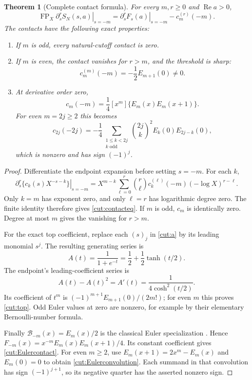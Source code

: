 \documentclass[11pt]{article}
\newtheorem{theorem}{Theorem}[section]
\theoremstyle{definition}
\theoremstyle{remark}
\numberwithin{equation}{section}
\newcommand{\FP}{\operatorname{FP}}
\newcommand{\Rea}{\operatorname{Re}}
\begin{document}
\begin{theorem}[Complete contact formula]\label{cut:contacts}
For every $m,r\ge0$ and $\Rea a>0$,
\begin{equation}\label{cut:contacteq}
 \boxed{\displaystyle
 \FP_X\left.\partial_s^rS_N(s,a)\right|_{s=-m}
   =\left.\partial_s^rF_s(a)\right|_{s=-m}-c_m^{(r)}(-m).}
\end{equation}
The contacts have the following exact properties:
\begin{enumerate}
\item If $m$ is odd, every natural-cutoff contact is zero.
\item If $m$ is even, the contact vanishes for $r>m$, and the threshold
is sharp:
\begin{equation}\label{cut:top}
 c_m^{(m)}(-m)=-\frac12 E_{m+1}(0)\ne0.
\end{equation}
\item At derivative order zero,
\begin{equation}\label{cut:Eulercontact}
 c_m(-m)=\frac14[x^m]\{E_m(x)E_m(x+1)\}.
\end{equation}
For even $m=2j\ge2$ this becomes
\begin{equation}\label{cut:Eulerconvolution}
 c_{2j}(-2j)
 =-\frac14\sum_{\substack{1\le k<2j\\k\text{ odd}}}
     \binom{2j}{k}^{\!2}E_k(0)E_{2j-k}(0),
\end{equation}
which is nonzero and has sign $(-1)^j$.
\end{enumerate}
\end{theorem}
\begin{proof}
Differentiate the endpoint expansion before setting $s=-m$.
For each $k$,
\[
 \left.\partial_s^r\{c_k(s)X^{-s-k}\}\right|_{s=-m}
 =X^{m-k}\sum_{\ell=0}^{r}\binom r\ell
       c_k^{(\ell)}(-m)(-\log X)^{r-\ell}.
\]
Only $k=m$ has exponent zero, and only $\ell=r$ has logarithmic degree
zero. The finite identity therefore gives \eqref{cut:contacteq}.
If $m$ is odd, $c_m$ is identically zero. Degree at most $m$ gives the
vanishing for $r>m$.

For the exact top coefficient, replace each $(s)_j$ in \eqref{cut:a}
by its leading monomial $s^j$. The resulting generating series is
\[
 A(t)=\frac1{1+e^{-t}}=\frac12+\frac12\tanh(t/2).
\]
The endpoint's leading-coefficient series is
\[
 A(t)-A(t)^2=A'(t)=\frac1{4\cosh^2(t/2)}.
\]
Its coefficient of $t^m$ is
$(-1)^{m+1}E_{m+1}(0)/(2m!)$; for even $m$ this proves
\eqref{cut:top}. Odd Euler values at zero are nonzero, for example by
their elementary Bernoulli-number formula.

Finally $\mathcal B_{-m}(x)=E_m(x)/2$ is the classical Euler
specialization \cite{HuKimAsymptotic}. Hence
$F_{-m}(x)=x^{-m}E_m(x)E_m(x+1)/4$.
Its constant coefficient gives \eqref{cut:Eulercontact}. For even
$m\ge2$, use $E_m(x+1)=2x^m-E_m(x)$ and $E_m(0)=0$ to obtain
\eqref{cut:Eulerconvolution}. Each summand in that convolution has
sign $(-1)^{j+1}$, so its negative quarter has the asserted nonzero sign.
\end{proof}
\end{document}
